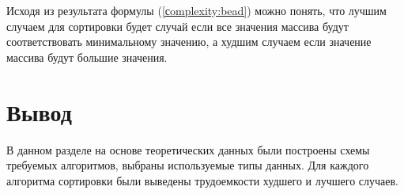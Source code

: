 Исходя из результата формулы (\ref{сomplexity:bead}) можно понять, что лучшим случаем для сортировки будет случай если все значения массива будут соответствовать минимальному значению, а худшим случаем если значение массива будут большие значения. 

\section*{Вывод}

В данном разделе на основе теоретических данных были построены схемы
требуемых алгоритмов, выбраны используемые типы данных. Для каждого алгоритма сортировки были выведены трудоемкости худшего и лучшего случаев.
